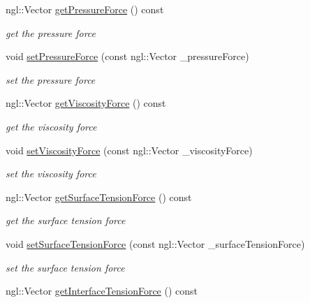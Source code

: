 \begin{DoxyCompactItemize}
\item 
ngl::Vector \hyperlink{class_fluid_particle_af1320742baea9749e69f29b6ab8c3ccd}{getPressureForce} () const 
\begin{DoxyCompactList}\small\item\em get the pressure force \item\end{DoxyCompactList}\item 
void \hyperlink{class_fluid_particle_a5d08a37988851625883aeae32fca6a53}{setPressureForce} (const ngl::Vector \_\-pressureForce)
\begin{DoxyCompactList}\small\item\em set the pressure force \item\end{DoxyCompactList}\item 
ngl::Vector \hyperlink{class_fluid_particle_a7c5bec4da4095e8ea26bd2de436b2cc2}{getViscosityForce} () const 
\begin{DoxyCompactList}\small\item\em get the viscosity force \item\end{DoxyCompactList}\item 
void \hyperlink{class_fluid_particle_ac4e550043305501a7157dd1489ae4a1a}{setViscosityForce} (const ngl::Vector \_\-viscosityForce)
\begin{DoxyCompactList}\small\item\em set the viscosity force \item\end{DoxyCompactList}\item 
ngl::Vector \hyperlink{class_fluid_particle_a8c8125b381ee8f354bb38e199a865dfe}{getSurfaceTensionForce} () const 
\begin{DoxyCompactList}\small\item\em get the surface tension force \item\end{DoxyCompactList}\item 
void \hyperlink{class_fluid_particle_ac7854dc82e9b28d515021a5616973d8b}{setSurfaceTensionForce} (const ngl::Vector \_\-surfaceTensionForce)
\begin{DoxyCompactList}\small\item\em set the surface tension force \item\end{DoxyCompactList}\item 
ngl::Vector \hyperlink{class_fluid_particle_a87969914565f0dfe9885f2788ced39b7}{getInterfaceTensionForce} () const 

\end{DoxyCompactItemize}
